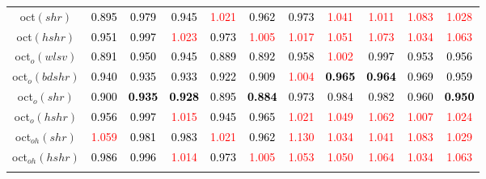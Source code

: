 \begin{tabular}[t]{c|>{}cccc>{}c|ccccc}
oct$(shr)$ & \textcolor{black}{0.895} & \textcolor{black}{0.979} & \textcolor{black}{0.945} & \textcolor{red}{1.021} & \textcolor{black}{0.962} & \textcolor{black}{0.973} & \textcolor{red}{1.041} & \textcolor{red}{1.011} & \textcolor{red}{1.083} & \textcolor{red}{1.028}\\
oct$(hshr)$ & \textcolor{black}{0.951} & \textcolor{black}{0.997} & \textcolor{red}{1.023} & \textcolor{black}{0.973} & \textcolor{red}{1.005} & \textcolor{red}{1.017} & \textcolor{red}{1.051} & \textcolor{red}{1.073} & \textcolor{red}{1.034} & \textcolor{red}{1.063}\\
oct$_o(wlsv)$ & \textcolor{black}{0.891} & \textcolor{black}{0.950} & \textcolor{black}{0.945} & \textcolor{black}{0.889} & \textcolor{black}{0.892} & \textcolor{black}{0.958} & \textcolor{red}{1.002} & \textcolor{black}{0.997} & \textcolor{black}{0.953} & \textcolor{black}{0.956}\\
oct$_o(bdshr)$ & \textcolor{black}{0.940} & \textcolor{black}{0.935} & \textcolor{black}{0.933} & \textcolor{black}{0.922} & \textcolor{black}{0.909} & \textcolor{red}{1.004} & \textcolor{black}{\textbf{0.965}} & \textcolor{black}{\textbf{0.964}} & \textcolor{black}{0.969} & \textcolor{black}{0.959}\\
oct$_o(shr)$ & \textcolor{black}{0.900} & \textcolor{black}{\textbf{0.935}} & \textcolor{black}{\textbf{0.928}} & \textcolor{black}{0.895} & \textcolor{black}{\textbf{0.884}} & \textcolor{black}{0.973} & \textcolor{black}{0.984} & \textcolor{black}{0.982} & \textcolor{black}{0.960} & \textcolor{black}{\textbf{0.950}}\\
oct$_o(hshr)$ & \textcolor{black}{0.956} & \textcolor{black}{0.997} & \textcolor{red}{1.015} & \textcolor{black}{0.945} & \textcolor{black}{0.965} & \textcolor{red}{1.021} & \textcolor{red}{1.049} & \textcolor{red}{1.062} & \textcolor{red}{1.007} & \textcolor{red}{1.024}\\
oct$_{oh}(shr)$ & \textcolor{red}{1.059} & \textcolor{black}{0.981} & \textcolor{black}{0.983} & \textcolor{red}{1.021} & \textcolor{black}{0.962} & \textcolor{red}{1.130} & \textcolor{red}{1.034} & \textcolor{red}{1.041} & \textcolor{red}{1.083} & \textcolor{red}{1.029}\\
oct$_{oh}(hshr)$ & \textcolor{black}{0.986} & \textcolor{black}{0.996} & \textcolor{red}{1.014} & \textcolor{black}{0.973} & \textcolor{red}{1.005} & \textcolor{red}{1.053} & \textcolor{red}{1.050} & \textcolor{red}{1.064} & \textcolor{red}{1.034} & \textcolor{red}{1.063}\\
\addlinespace[0.3em]

\end{tabular}
